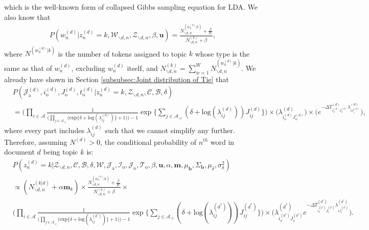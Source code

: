 \documentclass[a4paper]{article}
\begin{document}
   which is the well-known form of collapsed Gibbs sampling equation for LDA. We also know that \begin{equation}
   \begin{aligned} 
   P(w^{(d)}_n|z^{(d)}_n=k, \mathcal{W}_{\backslash d, n}, \mathcal{Z}_{\backslash d, n}, \beta, \boldsymbol{u} )=\frac{N^{(w_n^{(d)}|k)}_{\backslash d, n}+\frac{\beta}{W} }{N^{(k)}_{\backslash d, n}+\beta},
   \end{aligned}
   \end{equation}
   where $N^{(w_n^{(d)}|k)}$ is the number of tokens assigned to topic $k$ whose type is the same as that of $w_n^{(d)}$, excluding $w_n^{(d)}$ itself, and $N^{(k)}_{\backslash d, n}=\sum_{w=1}^W N_{\backslash d, n}^{(w_n^{(d)}|k)}$. We already have shown in Section \ref{subsubsec:Joint distribution of Tie} that
   \begin{equation}
   \begin{aligned}
   & P(\mathcal{J}^{(d)}_{\mbox{a}}, i^{(d)}_{\mbox{o}}, J^{(d)}_{\mbox{o}}, t^{(d)}_{\mbox{o}}| z^{(d)}_n=k, \mathcal{Z}_{\backslash d, n}, \mathcal{C}, \mathcal{B}, \delta)\\&=\Big( \prod_{i\in \mathcal{A}}\frac{1}{\Big(\prod_{j \in \mathcal{A}_{\backslash i}} \Big(\mbox{exp}\{\delta+\mbox{log}(\lambda_{ij}^{(d)})\} + 1\Big)\Big)-1}\exp\Big\{\sum_{j \in \mathcal{A}_{\backslash i}} (\delta+\mbox{log}(\lambda_{ij}^{(d)}))J_{ij}^{(d)} \Big\}\Big)\times \Big(\lambda^{(d)}_{i_o^{(d)}J_{o}^{(d)}}\Big)\times \Big(e^{-\Delta T^{(d)}_{i_o^{(d)}J_o^{(d)}}\lambda^{(d)}_{iJ^{(d)}_{i}}}\Big),
   \end{aligned}
   \end{equation}
   where every part includes $\lambda_{ij}^{(d)}$ such that we cannot simplify any further. Therefore, assuming $N^{(d)} > 0$, the conditional probability of $n^{th}$ word in document $d$ being topic $k$ is:
   \begin{equation}
   \begin{aligned}
   &P(z^{(d)}_n=k|\mathcal{Z}_{\backslash d, n},   \mathcal{C},   \mathcal{B}, \delta, \mathcal{W}, \mathcal{J}_{\mbox{a}}, \mathcal{I}_{\mbox{o}}, \mathcal{J}_{\mbox{o}}, \mathcal{T}_{\mbox{o}}, \beta, \boldsymbol{u}, \alpha, \boldsymbol{m},  \mu_{\boldsymbol{b}}, \Sigma_{\boldsymbol{b}}, \mu_\delta, \sigma^2_\delta)\\&\propto (N^{(k|d)}_{\backslash d, n}+\alpha \boldsymbol{m}_k)\times \frac{N^{(w_n^{(d)}|k)}_{\backslash d, n}+\frac{\beta}{W} }{N^{(k)}_{\backslash d, n}+\beta}\times \\&
   \Big(\prod_{i\in \mathcal{A}} \frac{1}{\Big(\prod_{j \in \mathcal{A}_{\backslash i}} \Big(\mbox{exp}\{\delta+\mbox{log}(\lambda_{ij}^{(d^*)})\} + 1\Big)\Big)-1}\exp\Big\{\sum_{j \in \mathcal{A}_{\backslash i}} (\delta+\mbox{log}(\lambda_{ij}^{(d^*)}))J_{ij}^{(d^*)} \Big\}\Big)\times \Big(\lambda^{(d^*)}_{i_o^{(d^*)}J_{o}^{(d^*)}}e^{-\Delta T^{(d^*)}_{i_o^{(d^*)}J_o^{(d^*)}}\lambda^{(d^*)}_{iJ^{(d^*)}_{i}}}\Big).
   \end{aligned}
   \end{equation}
   
\end{document}
